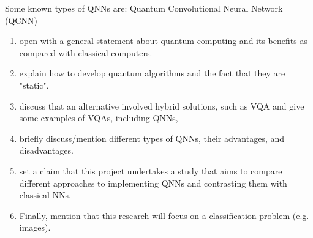 Some known types of QNNs are: Quantum Convolutional Neural Network (QCNN)

\begin{enumerate}
    \item open with a general statement about quantum computing and its benefits as compared with classical computers.
    \item explain how to develop quantum algorithms and the fact that they are "static".
    \item discuss that an alternative involved hybrid solutions, such as VQA and give some examples of VQAs, including QNNs, 
    \item briefly discuss/mention different types of QNNs, their advantages, and disadvantages.
    \item set a claim that this project undertakes a study that aims to compare different approaches to implementing QNNs and contrasting them with classical NNs.
    \item Finally, mention that this research will focus on a classification problem (e.g. images).
\end{enumerate}